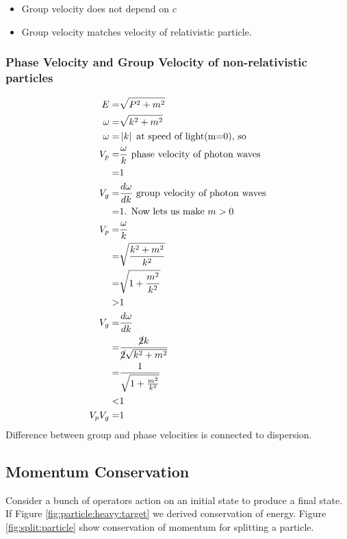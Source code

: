 \documentclass[]{article}
\begin{document}
\begin{itemize}
	\item Group velocity does not depend on $c$
	\item Group velocity matches velocity of relativistic particle.
\end{itemize}

\subsubsection{Phase Velocity and Group Velocity of non-relativistic particles}

\begin{align*}
E =& \sqrt{P^2 + m^2}\\
\omega =& \sqrt{k^2 + m^2}\\
\omega =& \left| k \right| \text{ at speed of light(m=0), so}\\
V_p =& \frac{\omega}{k} \text{ phase velocity of photon waves}\\
 =&1\\
 V_g =& \frac{d\omega}{dk} \text{ group velocity of photon waves}\\
 =&1 \text{. Now lets us make $m>0$}\\
 V_p =& \frac{\omega}{k}\\
 =&\sqrt{\frac{k^2+m^2}{k^2}}\\
 =&\sqrt{1+\frac{m^2}{k^2}}\\
 >&1 \\
 V_g =& \frac{d\omega}{dk} \\
 =& \frac{\cancel{2}k}{\cancel{2}\sqrt{k^2+m^2}}\\
 =& \frac{1}{\sqrt{1+\frac{m^2}{k^2}}}\\
 <&1\\
 V_p V_g =& 1
\end{align*}
Difference between group and phase velocities is connected to dispersion.

\subsection{Momentum Conservation}\label{sec:momentum:conservation}

Consider a bunch of operators action on an initial state to produce a final state. If Figure \ref{fig:particle:heavy:target} we derived conservation of energy. Figure \ref{fig:split:particle} show conservation of momentum for splitting a particle. 
 
\end{document}
